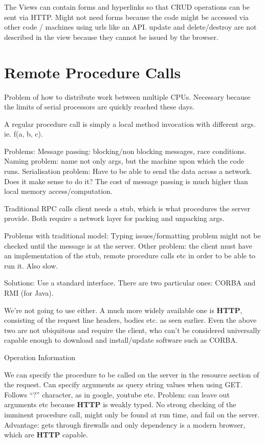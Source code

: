 \documentclass[11pt]{article}
\begin{document}
The Views can contain forms and hyperlinks so that CRUD operations can be sent via HTTP. Might not need forms because the code might be accessed via other code / machines using urls like an API. update and delete/destroy are not described in the view because they cannot be issued by the browser.


\section{Remote Procedure Calls}
\label{sec:RPC}

Problem of how to distribute work between multiple CPUs. Necessary because the limits of serial processors are quickly reached these days.

A regular procedure call is simply a local method invocation with different args. ie. f(a, b, c).

Problems:
Message passing: blocking/non blocking messages, race conditions.
Naming problem: name not only args, but the machine upon which the code runs.
Serialisation problem: Have to be able to send the data across a network.
Does it make sense to do it? The cost of message passing is much higher than local memory access/computation.

Traditional RPC calls client needs a stub, which is what procedures the server provide. Both require a network layer for packing and unpacking args.

Problems with traditional model:
Typing issues/formatting problem might not be checked until the message is at the server.
Other problem: the client must have an implementation of the stub, remote procedure calls etc in order to be able to run it.
Also slow.

Solutions:
Use a standard interface. There are two particular ones: CORBA and RMI (for Java). 

We’re not going to use either. A much more widely available one is \textbf{HTTP}, consisting of the request line headers, bodies etc. as seen earlier. Even the above two are not ubiquitous and require the client, who can’t be considered universally capable enough to download and install/update software such as CORBA.

Operation Information

We can specify the procedure to be called on the server in the resource section of the request.
Can specify arguments as query string values when using GET. Follows “?” character, as in google, youtube etc. Problem: can leave out arguments etc because \textbf{HTTP} is weakly typed. No strong checking of the imminent procedure call, might only be found at run time, and fail on the server. Advantage: gets through firewalls and only dependency is a modern browser, which are \textbf{HTTP} capable.
\end{document}
